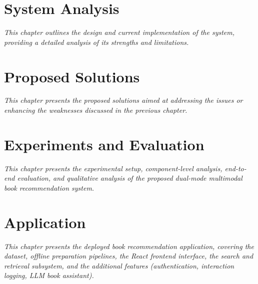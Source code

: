 \documentclass[12pt]{report}
\begin{document}
\chapter{System Analysis}
\textit{This chapter outlines the design and current implementation of the system, providing a detailed analysis of its strengths and limitations.}





\chapter{Proposed Solutions}
\textit{This chapter presents the proposed solutions aimed at addressing the issues or enhancing the weaknesses discussed in the previous chapter.}








\chapter{Experiments and Evaluation}

\textit{This chapter presents the experimental setup, component-level analysis, end-to-end evaluation, and qualitative analysis of the proposed dual-mode multimodal book recommendation system.}







\chapter{Application}

\textit{This chapter presents the deployed book recommendation application, covering the dataset, offline preparation pipelines, the React frontend interface, the search and retrieval subsystem, and the additional features (authentication, interaction logging, LLM book assistant).}









\end{document}
